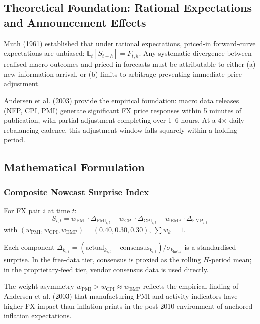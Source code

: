 \documentclass[11pt]{article}
\begin{document}
\subsection{Theoretical Foundation: Rational Expectations and Announcement Effects}

Muth (1961) established that under rational expectations, priced-in forward-curve expectations are unbiased: $\mathbb{E}_t[S_{t+h}] = F_{t,h}$. Any systematic divergence between realised macro outcomes and priced-in forecasts must be attributable to either (a) new information arrival, or (b) limits to arbitrage preventing immediate price adjustment.

Andersen et al. (2003) provide the empirical foundation: macro data releases (NFP, CPI, PMI) generate significant FX price responses within 5 minutes of publication, with partial adjustment completing over 1--6 hours. At a 4$\times$ daily rebalancing cadence, this adjustment window falls squarely within a holding period.

\subsection{Mathematical Formulation}

\subsubsection{Composite Nowcast Surprise Index}

For FX pair $i$ at time $t$:
\begin{equation}
S_{i,t} = w_{\text{PMI}} \cdot \Delta_{\text{PMI}_{i,t}} + w_{\text{CPI}} \cdot \Delta_{\text{CPI}_{i,t}} + w_{\text{EMP}} \cdot \Delta_{\text{EMP}_{i,t}}
\label{eq:nowcast-index}
\end{equation}
with $(w_{\text{PMI}}, w_{\text{CPI}}, w_{\text{EMP}}) = (0.40, 0.30, 0.30)$, $\sum w_k = 1$.

Each component $\Delta_{k_{i,t}} = (\text{actual}_{k_{i,t}} - \text{consensus}_{k_{i,t}})/\sigma_{k_{\text{hist},i}}$ is a standardised surprise. In the free-data tier, consensus is proxied as the rolling $H$-period mean; in the proprietary-feed tier, vendor consensus data is used directly.

The weight asymmetry $w_{\text{PMI}} > w_{\text{CPI}} \approx w_{\text{EMP}}$ reflects the empirical finding of Andersen et al. (2003) that manufacturing PMI and activity indicators have higher FX impact than inflation prints in the post-2010 environment of anchored inflation expectations.
\end{document}
